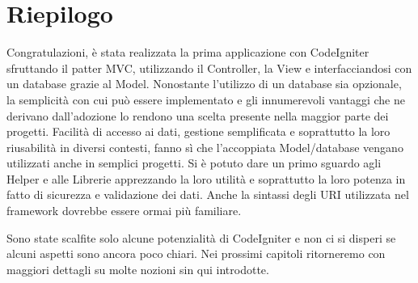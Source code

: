 \section{Riepilogo}
Congratulazioni, è stata realizzata la prima applicazione con CodeIgniter sfruttando il patter \ac{MVC}, utilizzando il Controller, la View e interfacciandosi con un database grazie al Model. Nonostante l'utilizzo di un database sia opzionale, la semplicità con cui può essere implementato e gli innumerevoli vantaggi che ne derivano dall'adozione lo rendono una scelta presente nella maggior parte dei progetti. Facilità di accesso ai dati, gestione semplificata e soprattutto la loro riusabilità in diversi contesti, fanno sì che l'accoppiata Model/database vengano utilizzati anche in semplici progetti. Si è potuto dare un primo sguardo agli Helper e alle Librerie apprezzando la loro utilità e soprattutto la loro potenza in fatto di sicurezza e validazione dei dati. Anche la sintassi degli \ac{URI} utilizzata nel framework dovrebbe essere ormai più familiare.

Sono state scalfite solo alcune potenzialità di CodeIgniter e non ci si disperi se alcuni aspetti sono ancora poco chiari. Nei prossimi capitoli ritorneremo con maggiori dettagli su molte nozioni sin qui introdotte.